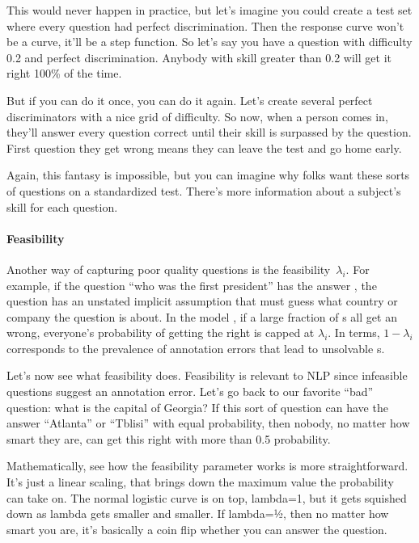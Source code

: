 This would never happen in practice, but let’s imagine you could create a test
set where every question had perfect discrimination.  Then the response curve
won’t be a curve, it’ll be a step function.  So let’s say you have a question
with difficulty 0.2 and perfect discrimination.  Anybody with skill greater
than 0.2 will get it right 100\% of the time.

But if you can do it once, you can do it again.  Let’s create several perfect
discriminators with a nice grid of difficulty.  So now, when a person comes
in, they’ll answer every question correct until their skill is surpassed by
the question.  First question they get wrong means they can leave the test and
go home early.

Again, this fantasy is impossible, but you can imagine why folks want these
sorts of questions on a standardized test.  There’s more information about a
subject’s skill for each question.

\paragraph{Feasibility}

Another way of capturing poor quality questions is the
feasibility~$\lambda_i$.
For example, if the question ``who was the first president'' has the
answer , the question has an unstated implicit
assumption that \subjs{} must guess what country or company the
question is about.
In the model {\bf {}}, if a large fraction of \subj{}s all get an
\itm{} wrong, everyone's probability of getting the \itm{} right is
capped at $\lambda_i$.
In \nlp{} terms, $1-\lambda_i$ corresponds to the prevalence of annotation
errors that lead to unsolvable \itm{}s.


Let’s now see what feasibility does.  Feasibility is relevant to NLP since
infeasible questions suggest an annotation error. Let’s go back to our
favorite ``bad'' question: what is the capital of Georgia?  If this sort of
question can have the answer ``Atlanta'' or ``Tblisi'' with equal probability,
then nobody, no matter how smart they are, can get this right with more than
0.5 probability.

Mathematically, see how the feasibility parameter works is more
straightforward.  It’s just a linear scaling, that brings down the maximum
value the probability can take on.  The normal logistic curve is on top,
lambda=1, but it gets squished down as lambda gets smaller and smaller.  If
lambda=½, then no matter how smart you are, it’s basically a coin flip whether
you can answer the question.

